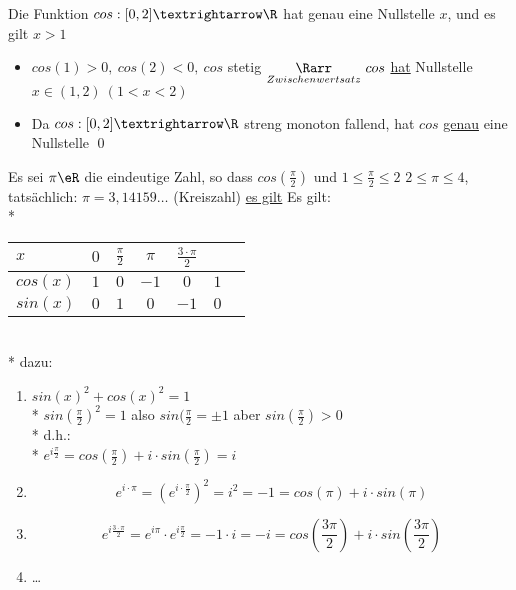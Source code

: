 Die Funktion $cos:[0,2]→\R$ hat genau eine Nullstelle $x$, und es gilt $x>1$
\bew
\begin{itemize}
\item{$cos(1)>0,\ cos(2)<0,\ cos$ stetig $\underset{Zwischenwertsatz}{\Rarr}\ cos$ \ul{hat} Nullstelle $x\in(1,2)\ (1<x<2)$}
\item{Da $cos:[0,2]→\R$ streng monoton fallend, hat $cos$ \ul{genau} eine Nullstelle \qed}
\end{itemize}

Es sei $\pi\eR$ die eindeutige Zahl, so dass $cos(\frac{\pi}{2})$ und $1\leq\frac{\pi}{2}\leq 2$
\bem
$2\leq \pi \leq 4$, tatsächlich: $\pi=3,14159…$ (Kreiszahl)
\ul{es gilt}
Es gilt:\\*
\begin{tabular}{l|c|c|c|c|c|l}
$x$ & $0$ & $\frac{\pi}{2}$ & $\pi$ & $\frac{3 \cdot \pi}{2}$ &\\\hline
$cos(x)$ & $1$ & $0$ & $-1$ & $0$ & $1$ & \\\hline
$sin(x)$ & $0$ & $1$ & $0$ & $-1$ & $0$ & \\\hline
\end{tabular}
\hfill\\*
dazu:
\begin{enumerate}
\item{$sin(x)^2 + cos(x)^2 = 1$\\*
$sin(\frac{\pi}{2})^2 = 1$ also $sin(\frac{\pi}{2} = \pm 1$ aber $sin(\frac{\pi}{2}) > 0$\\*
d.h.:\\*
$e^{i \frac{\pi}{2}} = cos(\frac{\pi}{2}) + i \cdot sin(\frac{\pi}{2}) = i$}
\item{$$e^{i\cdot \pi} = (e^{i\cdot \frac{\pi}{2}})^2 = i^2 = -1 = cos(\pi) + i \cdot sin(\pi)$$}
\item{$$e^{i\frac{3 \cdot \pi}{2}} = e^{i\pi} \cdot e^{i\frac{\pi}{2}} = -1 \cdot i = -i = cos(\frac{3\pi}{2}) + i \cdot sin(\frac{3\pi}{2})$$}
\item{…}
\end{enumerate}

